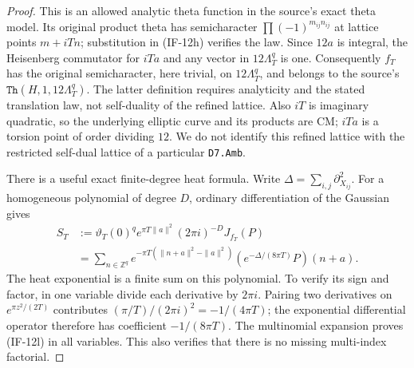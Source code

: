\begin{proof}
This is an allowed analytic theta function in the source's exact
theta model. Its original product theta has semicharacter
$\prod(-1)^{m_{ij}n_{ij}}$ at lattice points $m+iTn$; substitution
in (IF-12h) verifies the law. Since $12a$ is integral, the Heisenberg
commutator for $iTa$ and any vector in $12\Lambda_T^q$ is one.
Consequently $f_T$ has the original semicharacter, here trivial,
on $12\Lambda_T^q$, and belongs to the source's
$\texttt{Th}(H,1,12\Lambda_T^q)$. The latter definition requires
analyticity and the stated translation law, not self-duality of the
refined lattice. Also $iT$ is imaginary quadratic, so the underlying
elliptic curve and its products are CM; $iTa$ is a torsion point of
order dividing $12$. We do not identify this refined lattice with
the restricted self-dual lattice of a particular \texttt{D7.Amb}.

There is a useful exact finite-degree heat formula. Write
$\Delta=\sum_{i,j}\partial_{X_{ij}}^2$. For a homogeneous polynomial
of degree $D$, ordinary differentiation of the Gaussian gives
\[
 \begin{split}
 S_T&:=\vartheta_T(0)^q e^{\pi T\|a\|^2}(2\pi i)^{-D}
                                                    J_{f_T}(P)\\
 &=\sum_{n\in\mathbb Z^q}
    e^{-\pi T(\|n+a\|^2-\|a\|^2)}
       \left(e^{-\Delta/(8\pi T)}P\right)(n+a).
 \end{split}                                                  \tag{IF-12l}
\]
The heat exponential is a finite sum on this polynomial. To verify
its sign and factor, in one variable divide each derivative by
$2\pi i$. Pairing two derivatives on
$e^{\pi z^2/(2T)}$ contributes
$(\pi/T)/(2\pi i)^2=-1/(4\pi T)$; the exponential differential
operator therefore has coefficient $-1/(8\pi T)$. The multinomial
expansion proves (IF-12l) in all variables. This also verifies that
there is no missing multi-index factorial.


\end{proof}
